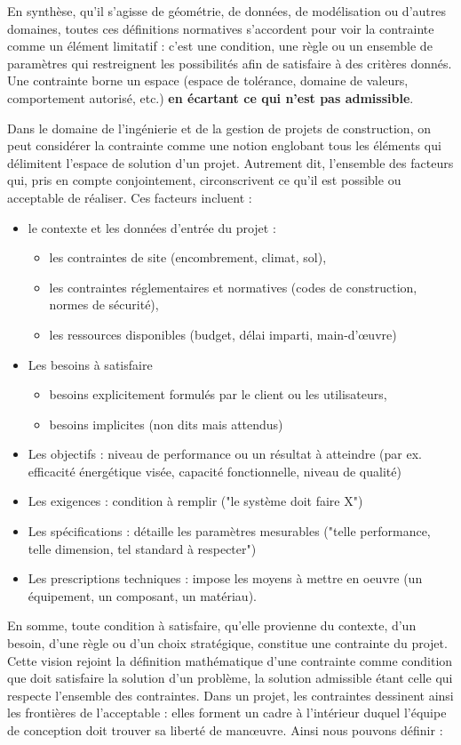 \documentclass[a4paper,12pt]{article}
\begin{document}
En synthèse, qu’il s’agisse de géométrie, de données, de modélisation ou d’autres domaines, toutes ces définitions normatives s’accordent pour voir la contrainte comme un élément limitatif : c’est une condition, une règle ou un ensemble de paramètres qui restreignent les possibilités afin de satisfaire à des critères donnés. Une contrainte borne un espace (espace de tolérance, domaine de valeurs, comportement autorisé, etc.) \textbf{en écartant ce qui n’est pas admissible}.

Dans le domaine de l’ingénierie et de la gestion de projets de construction, on peut considérer la contrainte comme une notion englobant tous les éléments qui délimitent l’espace de solution d’un projet. Autrement dit, l’ensemble des facteurs qui, pris en compte conjointement, circonscrivent ce qu’il est possible ou acceptable de réaliser. Ces facteurs incluent :
\begin{itemize}
\item le contexte et les données d’entrée du projet :
\begin{itemize}
\item les contraintes de site (encombrement, climat, sol),
\item les contraintes réglementaires et normatives (codes de construction, normes de sécurité),
\item les ressources disponibles (budget, délai imparti, main-d’œuvre)
\end{itemize}
\item Les besoins à satisfaire
\begin{itemize}
\item besoins explicitement formulés par le client ou les utilisateurs,
\item besoins implicites (non dits mais attendus)
\end{itemize}
\item Les objectifs : niveau de performance ou un résultat à atteindre (par ex. efficacité énergétique visée, capacité fonctionnelle, niveau de qualité)
\item Les exigences : condition à remplir ("le système doit faire X")
\item Les spécifications : détaille les paramètres mesurables ("telle performance, telle dimension, tel standard à respecter")
\item Les prescriptions techniques : impose les moyens à mettre en oeuvre (un équipement, un composant, un matériau).
\end{itemize}

En somme, toute condition à satisfaire, qu’elle provienne du contexte, d’un besoin, d’une règle ou d’un choix stratégique, constitue une contrainte du projet. Cette vision rejoint la définition mathématique d’une contrainte comme condition que doit satisfaire la solution d’un problème, la solution admissible étant celle qui respecte l’ensemble des contraintes. Dans un projet, les contraintes dessinent ainsi les frontières de l’acceptable : elles forment un cadre à l’intérieur duquel l’équipe de conception doit trouver sa liberté de manœuvre. Ainsi nous pouvons définir :
\end{document}
